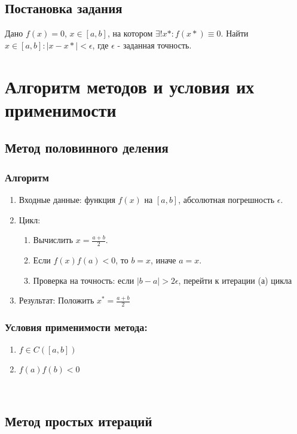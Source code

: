 \documentclass{article}
\begin{document}
	\subsection{Постановка задания}
	Дано $f(x)=0$, $x\in[a, b]$, на котором $\exists!x*:f(x*)\equiv0$. Найти $x\in[a, b]:|x-x*|<\epsilon$, где $\epsilon$ - заданная точность.
	
	\section{Алгоритм методов и условия их применимости}
	\subsection{Метод половинного деления}
	\subsubsection{Алгоритм}
	\begin{enumerate}
		\item Входные данные: функция $f(x)$ на $[a, b]$, абсолютная погрешность $\epsilon$.
		\item Цикл: 
		\begin{enumerate}
			\item Вычислить $x=\frac{a+b}{2}$.
			\item Если $f(x)f(a)<0$, то $b=x$, иначе $a=x$.
			\item Проверка на точность: если $|b-a|>2\epsilon$, перейти к итерации (а) цикла 
		\end{enumerate}
		\item Результат: Положить $x^*=\frac{a+b}{2}$
	\end{enumerate}
	\subsubsection{Условия применимости метода:}
	\begin{enumerate}
		\item $f \in C([a, b])$
		\item $f(a)f(b)<0$
	\end{enumerate}
	~\\    
	\subsection{Метод простых итераций}
\end{document}
